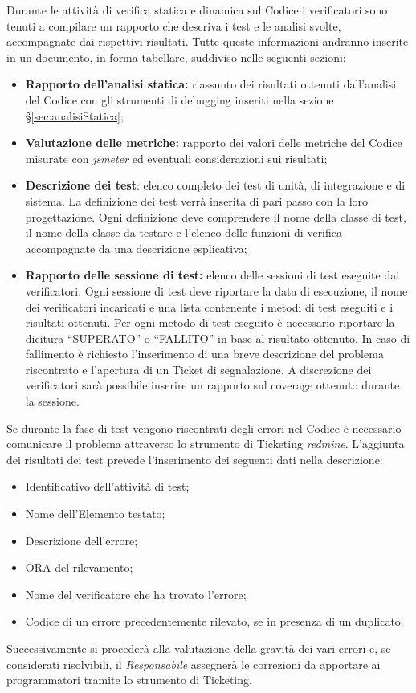   Durante le attività di verifica statica e dinamica sul Codice i verificatori sono tenuti a compilare un rapporto che descriva i test e le analisi svolte, accompagnate dai rispettivi risultati. Tutte queste informazioni andranno inserite in un documento, in forma tabellare, suddiviso nelle seguenti sezioni:
  \begin{itemize}
 \item \textbf{Rapporto dell’analisi statica:} riassunto dei risultati ottenuti dall’analisi del Codice con gli strumenti di debugging inseriti nella sezione \S\ref{sec:analisiStatica};
  
  \item \textbf{Valutazione delle metriche:} rapporto dei valori delle metriche del Codice misurate con \emph{jsmeter} ed eventuali considerazioni sui risultati;
  \item \textbf{Descrizione dei test}: elenco completo dei test di unità, di integrazione e di sistema. La definizione dei test verrà inserita di pari passo con la loro progettazione.
  Ogni definizione deve comprendere il nome della classe di test, il nome della classe da testare e l’elenco delle funzioni di verifica accompagnate da una descrizione esplicativa;
  \item \textbf{Rapporto delle sessione di test:} elenco delle sessioni di test eseguite dai verificatori. Ogni sessione di test deve riportare la data di esecuzione, il nome dei verificatori incaricati e una lista contenente i metodi di test eseguiti e i risultati ottenuti. Per ogni metodo di test eseguito è necessario riportare la dicitura “SUPERATO” o “FALLITO” in base al risultato ottenuto. In caso
  di fallimento è richiesto l’inserimento di una breve descrizione del problema riscontrato e l’apertura di un Ticket di segnalazione. A discrezione dei verificatori sarà possibile inserire un rapporto sul coverage ottenuto durante la sessione.
 \end{itemize} 
  Se durante la fase di test vengono riscontrati degli errori nel Codice è necessario comunicare il problema attraverso lo strumento di Ticketing \emph{redmine}.
  L’aggiunta dei risultati dei test prevede l’inserimento dei seguenti dati nella  descrizione:
  \begin{itemize}
  \item Identificativo dell’attività di test;
  \item Nome dell’Elemento testato;
  \item Descrizione dell’errore;
  \item ORA del rilevamento;
  \item Nome del verificatore che ha trovato l’errore;
  \item Codice di un errore precedentemente rilevato, se in presenza di un duplicato.
 \end{itemize}
  Successivamente si procederà alla valutazione della gravità dei vari errori e, se considerati risolvibili, il \emph{Responsabile} assegnerà le correzioni da apportare ai programmatori tramite lo strumento di Ticketing.